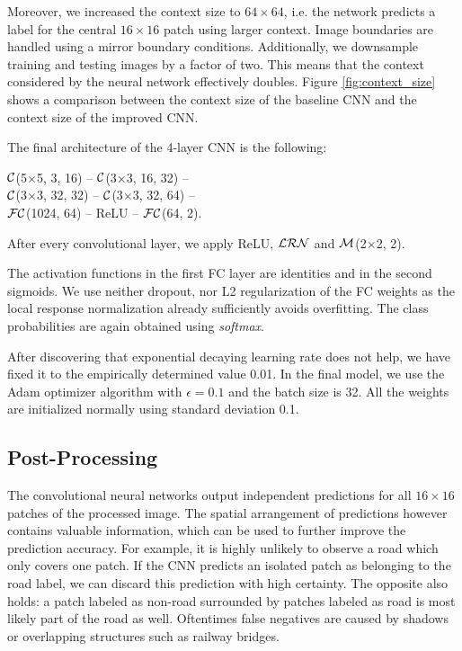 \documentclass[10pt,conference,compsocconf]{IEEEtran}
\newcommand{\conv}[3]{$ \cal{C} $(#1$ \times  $#1, #2, #3)}
\newcommand{\maxpool}[2]{$ \cal{M} $(#1$ \times $#1, #2)}
\newcommand{\lrn}{$ \cal{LRN}~$}
\newcommand{\fc}[2]{$ \cal{FC} $(#1, #2)}
\begin{document}
Moreover, we increased the context size to $ 64\times64 $, i.e. the network predicts a label for the central $ 16\times16 $ patch using larger context. Image boundaries are handled using a mirror boundary conditions. Additionally, we downsample training and testing images by a factor of two. This means that the context considered by the neural network effectively doubles. Figure \ref{fig:context_size} shows a comparison between the context size of the baseline CNN and the context size of the improved CNN.



The final architecture of the 4-layer CNN is the following:
\begin{center}
	\conv{5}{3}{16} -- \conv{3}{16}{32} -- \\ 
	\conv{3}{32}{32} -- \conv{3}{32}{64} -- \\
	\fc{1024}{64} -- ReLU -- \fc{64}{2}.
\end{center}
After every convolutional layer, we apply ReLU, \lrn and \maxpool{2}{2}.

The activation functions in the first FC layer are identities and in the second sigmoids. We use neither dropout, nor L2 regularization of the FC weights as the local response normalization already sufficiently avoids overfitting. The class probabilities are again obtained using \textit{softmax}.

After discovering that exponential decaying learning rate does not help, we have fixed it to the empirically determined value 0.01. 
In the final model, we use the Adam optimizer algorithm \cite{Adam.2014} with $ \epsilon = 0.1 $ and the batch size is 32. All the weights are initialized normally using standard deviation 0.1.


\subsection{Post-Processing}
The convolutional neural networks output independent predictions for all $ 16 \times 16 $ patches of the processed image. The spatial arrangement of predictions however contains valuable information, which can be used to further improve the prediction accuracy. For example, it is highly unlikely to observe a road which only covers one patch. If the CNN predicts an isolated patch as belonging to the road label, we can discard this prediction with high certainty. The opposite also holds: a patch labeled as non-road surrounded by patches labeled as road is most likely part of the road as well. Oftentimes false negatives are caused by shadows or overlapping structures such as railway bridges.
\end{document}
